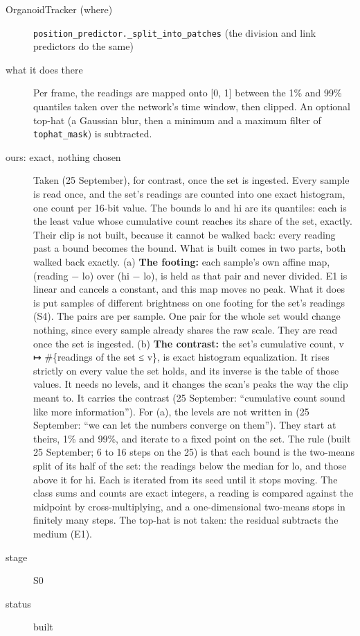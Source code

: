 \begin{description}
\item[{OrganoidTracker (where)}] \texttt{position\_\allowbreak{}predictor.\allowbreak{}\_\allowbreak{}split\_\allowbreak{}into\_\allowbreak{}patches} (the division and link predictors do the same)
\item[{what it does there}] Per frame, the readings are mapped onto [0, 1] between the 1\% and 99\% quantiles taken over the network's time window, then clipped. An optional top-hat (a Gaussian blur, then a minimum and a maximum filter of \texttt{tophat\_\allowbreak{}mask}) is subtracted.
\item[{ours: exact, nothing chosen}] Taken (25 September), for contrast, once the set is ingested. Every sample is read once, and the set's readings are counted into one exact histogram, one count per 16-bit value. The bounds lo and hi are its quantiles: each is the least value whose cumulative count reaches its share of the set, exactly. Their clip is not built, because it cannot be walked back: every reading past a bound becomes the bound. What is built comes in two parts, both walked back exactly. (a) \textbf{The footing:} each sample's own affine map, (reading − lo) over (hi − lo), is held as that pair and never divided. E1 is linear and cancels a constant, and this map moves no peak. What it does is put samples of different brightness on one footing for the set's readings (S4). The pairs are per sample. One pair for the whole set would change nothing, since every sample already shares the raw scale. They are read once the set is ingested. (b) \textbf{The contrast:} the set's cumulative count, v ↦ \#\{readings of the set ≤ v\}, is exact histogram equalization. It rises strictly on every value the set holds, and its inverse is the table of those values. It needs no levels, and it changes the scan's peaks the way the clip meant to. It carries the contrast (25 September: “cumulative count sound like more information”). For (a), the levels are not written in (25 September: “we can let the numbers converge on them”). They start at theirs, 1\% and 99\%, and iterate to a fixed point on the set. The rule (built 25 September; 6 to 16 steps on the 25) is that each bound is the two-means split of its half of the set: the readings below the median for lo, and those above it for hi. Each is iterated from its seed until it stops moving. The class sums and counts are exact integers, a reading is compared against the midpoint by cross-multiplying, and a one-dimensional two-means stops in finitely many steps. The top-hat is not taken: the residual subtracts the medium (E1).
\item[{stage}] S0
\item[{status}] built
\end{description}

